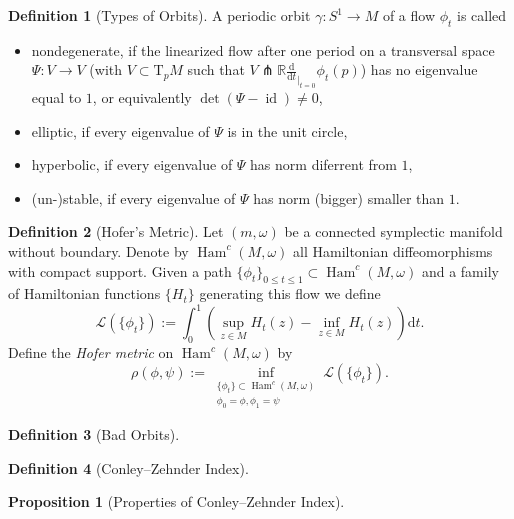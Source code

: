 \documentclass[a4paper]{article}
\newcommand{\RR}{\mathbb{R}}
\newcommand{\mcL}{\mathcal L}
\newcommand{\dd}{\mathrm{d}}
\newcommand{\lra}{\longrightarrow}
\newcommand{\ddt}{\frac{\dd}{\dd t}_{|_{t=0}}}
\newcommand{\id}{\operatorname{id}}
\newcommand{\ts}{\mathrm{T}}
\newcommand{\Ham}{\operatorname{Ham}}
\theoremstyle{definition}
\newtheorem{prop}{Proposition}
\theoremstyle{definition}
\newtheorem{definition}{Definition}
\theoremstyle{remark}
\theoremstyle{remark}
\theoremstyle{remark}
\begin{document}
\begin{definition}[Types of Orbits]
A periodic orbit $\gamma:S^1\lra M$ of a flow $\phi_t$ is called
\begin{itemize}
  \item nondegenerate, if the linearized flow after one period on a transversal space $\Psi:V\lra V$ (with $V\subset \ts_p M$ such that $V\pitchfork \RR\ddt\phi_t(p)$) has no eigenvalue equal to $1$, or equivalently $\det(\Psi-\id)\neq 0$,
  \item elliptic, if every eigenvalue of $\Psi$ is in the unit circle,
  \item hyperbolic, if every eigenvalue of $\Psi$ has norm diferrent from $1$,
  \item (un-)stable, if every eigenvalue of $\Psi$ has norm (bigger) smaller than $1$.
\end{itemize}
\end{definition}

\begin{definition}[Hofer's Metric]
  Let $(m,\omega)$ be a connected symplectic manifold without boundary. Denote by $\Ham^c(M,\omega)$ all Hamiltonian diffeomorphisms with compact support. Given a path $\{\phi_t\}_{0\leq t\leq 1}\subset\Ham^c(M,\omega)$ and a family of Hamiltonian functions $\{H_t\}$ generating this flow we define
  \begin{equation*}
    \mcL(\{\phi_t\}):=\int_0^1\left(\sup_{z\in M}H_t(z)-\inf_{z\in M} H_t(z)\right)\dd t.
  \end{equation*}
  Define the \emph{Hofer metric} on $\Ham^c(M,\omega)$ by
  \begin{equation*}
    \rho(\phi,\psi):=\inf_{\substack{\{\phi_t\}\subset\Ham^c(M,\omega)\\ \phi_0=\phi, \phi_1=\psi}}\mcL(\{\phi_t\}).
  \end{equation*}
\end{definition}

\begin{definition}[Bad Orbits]
  
\end{definition}

\begin{definition}[Conley--Zehnder Index]
  
\end{definition}

\begin{prop}[Properties of Conley--Zehnder Index]
  
\end{prop}
\end{document}

